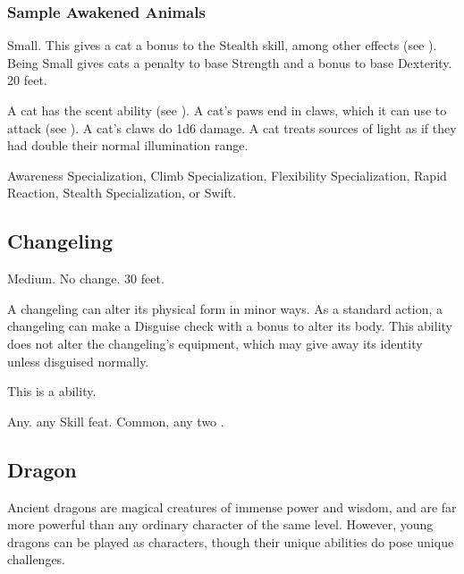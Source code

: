         \subsubsection{Sample Awakened Animals}


             Small. This gives a cat a  bonus to the Stealth skill, among other effects (see ).
             Being Small gives cats a  penalty to base Strength and a  bonus to base Dexterity.
             20 feet.
            \begin{itemize}
                 A cat has the scent ability (see ).
                 A cat's paws end in claws, which it can use to attack (see ). A cat's claws do 1d6 damage.
                 A cat treats sources of light as if they had double their normal illumination range.
            \end{itemize}
         Awareness Specialization, Climb Specialization, Flexibility Specialization, Rapid Reaction, Stealth Specialization, or Swift.

    \subsection{Changeling}

         Medium.
         No change.
         30 feet.
        \begin{itemize}
             A changeling can alter its physical form in minor ways. As a standard action, a changeling can make a Disguise check with a  bonus to alter its body. This ability does not alter the changeling's equipment, which may give away its identity unless disguised normally.

            This is a  ability.
        \end{itemize}
         Any.
         any Skill feat.
         Common, any two .

    \subsection{Dragon}
        Ancient dragons are magical creatures of immense power and wisdom, and are far more powerful than any ordinary character of the same level.
        However, young dragons can be played as characters, though their unique abilities do pose unique challenges.

